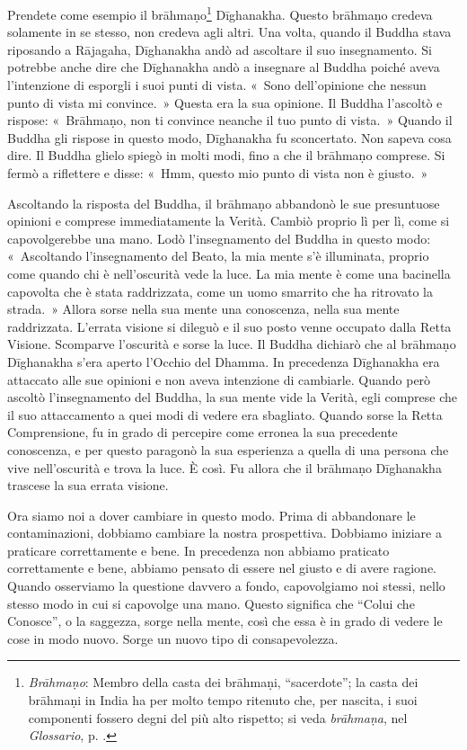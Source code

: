 Prendete come esempio il brāhmaṇo\footnote{\emph{Brāhmaṇo}: Membro della casta
  dei brāhmaṇi, ``sacerdote''; la casta dei brāhmaṇi in India ha per
  molto tempo ritenuto che, per nascita, i suoi componenti fossero degni
  del più alto rispetto; si veda \emph{brāhmaṇa}, nel \emph{Glossario}, p. \pageref{glossary-brahmana}.}
Dīghanakha. Questo brāhmaṇo credeva solamente in se stesso, non credeva
agli altri. Una volta, quando il Buddha stava riposando a Rājagaha,
Dīghanakha andò ad ascoltare il suo insegnamento. Si potrebbe anche dire
che Dīghanakha andò a insegnare al Buddha poiché aveva l'intenzione di
esporgli i suoi punti di vista. «~Sono dell'opinione che nessun punto di
vista mi convince.~» Questa era la sua opinione. Il Buddha l'ascoltò e
rispose: «~Brāhmaṇo, non ti convince neanche il tuo punto di vista.~»
Quando il Buddha gli rispose in questo modo, Dīghanakha fu sconcertato.
Non sapeva cosa dire. Il Buddha glielo spiegò in molti modi, fino a che
il brāhmaṇo comprese. Si fermò a riflettere e disse: «~Hmm, questo mio
punto di vista non è giusto.~»

Ascoltando la risposta del Buddha, il brāhmaṇo abbandonò le sue
presuntuose opinioni e comprese immediatamente la Verità. Cambiò proprio
lì per lì, come si capovolgerebbe una mano. Lodò l'insegnamento del
Buddha in questo modo: «~Ascoltando l'insegnamento del Beato, la mia
mente s'è illuminata, proprio come quando chi è nell'oscurità vede la
luce. La mia mente è come una bacinella capovolta che è stata
raddrizzata, come un uomo smarrito che ha ritrovato la strada.~» Allora
sorse nella sua mente una conoscenza, nella sua mente raddrizzata.
L'errata visione si dileguò e il suo posto venne occupato dalla Retta
Visione. Scomparve l'oscurità e sorse la luce. Il Buddha dichiarò che al
brāhmaṇo Dīghanakha s'era aperto l'Occhio del Dhamma. In precedenza
Dīghanakha era attaccato alle sue opinioni e non aveva intenzione di
cambiarle. Quando però ascoltò l'insegnamento del Buddha, la sua mente
vide la Verità, egli comprese che il suo attaccamento a quei modi di
vedere era sbagliato. Quando sorse la Retta Comprensione, fu in grado di
percepire come erronea la sua precedente conoscenza, e per questo
paragonò la sua esperienza a quella di una persona che vive
nell'oscurità e trova la luce. È così. Fu allora che il brāhmaṇo
Dīghanakha trascese la sua errata visione.

Ora siamo noi a dover cambiare in questo modo. Prima di abbandonare le
contaminazioni, dobbiamo cambiare la nostra prospettiva. Dobbiamo
iniziare a praticare correttamente e bene. In precedenza non abbiamo
praticato correttamente e bene, abbiamo pensato di essere nel giusto e
di avere ragione. Quando osserviamo la questione davvero a fondo,
capovolgiamo noi stessi, nello stesso modo in cui si capovolge una mano.
Questo significa che ``Colui che Conosce'', o la saggezza, sorge nella
mente, così che essa è in grado di vedere le cose in modo nuovo. Sorge
un nuovo tipo di consapevolezza.

